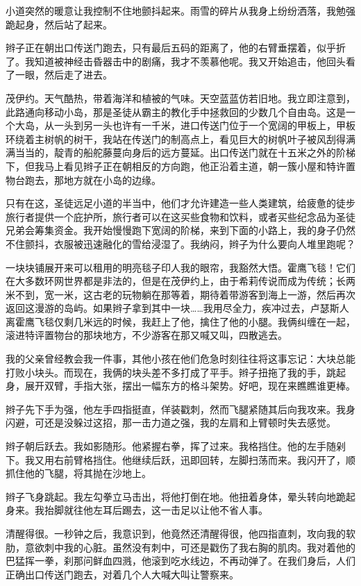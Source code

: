 \documentclass[AutoFakeBold=true]{book}
\begin{document}
小道突然的暖意让我控制不住地颤抖起来。雨雪的碎片从我身上纷纷洒落，我勉强跪起身，然后站了起来。

辫子正在朝出口传送门跑去，只有最后五码的距离了，他的右臂垂摆着，似乎折了。我知道被神经击昏器击中的剧痛，我才不羡慕他呢。我又开始追击，他回头看了一眼，然后走了进去。

茂伊约。天气酷热，带着海洋和植被的气味。天空蓝蓝仿若旧地。我立即注意到，此路通向移动小岛，那是圣徒从霸主的教化手中拯救回的少数几个自由岛。这是一个大岛，从一头到另一头也许有一千米，进口传送门位于一个宽阔的甲板上，甲板环绕着主树帆的树干，我站在传送门的制高点上，看见巨大的树帆叶子被风刮得满满当当的，靛青的船舵藤蔓向身后的远方蔓延。出口传送门就在十五米之外的阶梯下，但我马上看见辫子正在朝相反的方向跑，他正沿着主道，朝一簇小屋和特许置物台跑去，那地方就在小岛的边缘。

只有在这，圣徒远足小道的半当中，他们才允许建造一些人类建筑，给疲惫的徒步旅行者提供一个庇护所，旅行者可以在这买些食物和饮料，或者买些纪念品为圣徒兄弟会筹集资金。我开始慢慢跑下宽阔的阶梯，来到下面的小路上，我的身子仍然不住颤抖，衣服被迅速融化的雪给浸湿了。我纳闷，辫子为什么要向人堆里跑呢？

一块块铺展开来可以租用的明亮毯子印人我的眼帘，我豁然大悟。霍鹰飞毯！它们在大多数环网世界都是非法的，但是在茂伊约上，由于希莉传说而成为传统；长两米不到，宽一米，这古老的玩物躺在那等着，期待着带游客到海上一游，然后再次返回这漫游的岛屿。如果辫子拿到其中一块……我用尽全力，疾冲过去，卢瑟斯人离霍鹰飞毯仅剩几米远的时候，我赶上了他，擒住了他的小腿。我俩纠缠在一起，滚进特评置物台的那块地方，不少游客在那又喊又叫，四散逃去。

我的父亲曾经教会我一件事，其他小孩在他们危急时刻往往将这事忘记：大块总能打败小块头。而现在，我俩的块头差不多打成了平手。辫子扭拖了我的手，跳起身，展开双臂，手指大张，摆出一幅东方的格斗架势。好吧，现在来瞧瞧谁更棒。

辫子先下手为强，他左手四指挺直，佯装戳刺，然而飞腿紧随其后向我攻来。我身闪避，可还是没躲过这招，那一击力道之强，我的左肩和上臂顿时失去感觉。

辫子朝后跃去。我如影随形。他紧握右拳，挥了过来。我格挡住。他的左手随剁下。我又用右前臂格挡住。他继续后跃，迅即回转，左脚扫荡而来。我闪开了，顺抓住他的飞腿，将其抛在沙地上。

辫子飞身跳起。我左勾拳立马击出，将他打倒在地。他扭着身体，晕头转向地跪起身来。我抬脚就往他左耳后踢去，这一击足以让他不省人事。

清醒得很。一秒钟之后，我意识到，他竟然还清醒得很，他四指直刺，攻向我的软肋，意欲刺中我的心脏。虽然没有刺中，可还是戳伤了我右胸的肌肉。我对着他的巴猛挥一拳，刹那问鲜血四溅，他滚到吃水线边，不再动弹了。在我们身后，人们正确出口传送门跑去，对着几个人大喊大叫让警察来。
\end{document}
